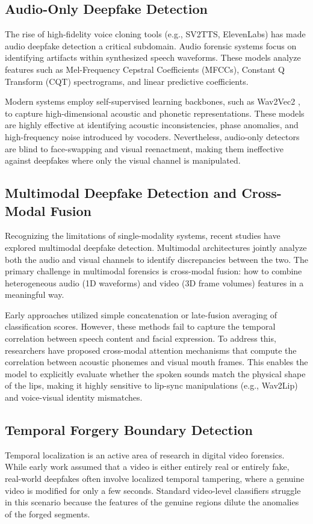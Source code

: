\documentclass[journal,10pt,onecolumn,draftclsnofoot]{IEEEtran}
\begin{document}
\subsection{Audio-Only Deepfake Detection}
The rise of high-fidelity voice cloning tools (e.g., SV2TTS, ElevenLabs) has made audio deepfake detection a critical subdomain. Audio forensic systems focus on identifying artifacts within synthesized speech waveforms. These models analyze features such as Mel-Frequency Cepstral Coefficients (MFCCs), Constant Q Transform (CQT) spectrograms, and linear predictive coefficients.

Modern systems employ self-supervised learning backbones, such as Wav2Vec2 \cite{baevski2020wav2vec}, to capture high-dimensional acoustic and phonetic representations. These models are highly effective at identifying acoustic inconsistencies, phase anomalies, and high-frequency noise introduced by vocoders. Nevertheless, audio-only detectors are blind to face-swapping and visual reenactment, making them ineffective against deepfakes where only the visual channel is manipulated.

\subsection{Multimodal Deepfake Detection and Cross-Modal Fusion}
Recognizing the limitations of single-modality systems, recent studies have explored multimodal deepfake detection. Multimodal architectures jointly analyze both the audio and visual channels to identify discrepancies between the two. The primary challenge in multimodal forensics is cross-modal fusion: how to combine heterogeneous audio (1D waveforms) and video (3D frame volumes) features in a meaningful way.

Early approaches utilized simple concatenation or late-fusion averaging of classification scores. However, these methods fail to capture the temporal correlation between speech content and facial expression. To address this, researchers have proposed cross-modal attention mechanisms that compute the correlation between acoustic phonemes and visual mouth frames. This enables the model to explicitly evaluate whether the spoken sounds match the physical shape of the lips, making it highly sensitive to lip-sync manipulations (e.g., Wav2Lip) and voice-visual identity mismatches.

\subsection{Temporal Forgery Boundary Detection}
Temporal localization is an active area of research in digital video forensics. While early work assumed that a video is either entirely real or entirely fake, real-world deepfakes often involve localized temporal tampering, where a genuine video is modified for only a few seconds. Standard video-level classifiers struggle in this scenario because the features of the genuine regions dilute the anomalies of the forged segments.
\end{document}
